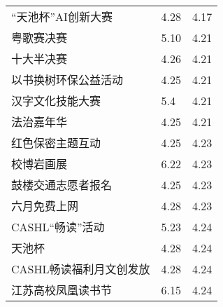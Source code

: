 \documentclass[letterpaper, 12pt]{article}
\begin{document}
\begin{multicols}{2}
{\begin{longtable}{|>{\centering\arraybackslash}m{}|m{}|m{}|}
    “天池杯”AI创新大赛 & 4.28 & 4.17\\
    粤歌赛决赛 & 5.10 & 4.21\\
    十大半决赛 & 4.26 & 4.21\\
    以书换树环保公益活动 & 4.25 & 4.21\\
    汉字文化技能大赛 & 5.4 & 4.21\\ 
    法治嘉年华 & 4.25 & 4.21\\
    红色保密主题互动 & 4.25 & 4.23\\
    校博岩画展 & 6.22 & 4.23\\
    鼓楼交通志愿者报名 & 4.25 & 4.23\\
    六月免费上网 & 4.28 & 4.23\\
    CASHL“畅读”活动 & 5.23 & 4.24\\
    天池杯 & 4.28 & 4.24\\
    CASHL畅读福利月文创发放 & 4.28 & 4.24\\
    江苏高校凤凰读书节 & 6.15 & 4.24\\

    \hline
\end{longtable}
\unskip
\unpenalty
\unpenalty}\unvbox\colbbox
\end{multicols}
\end{document}
